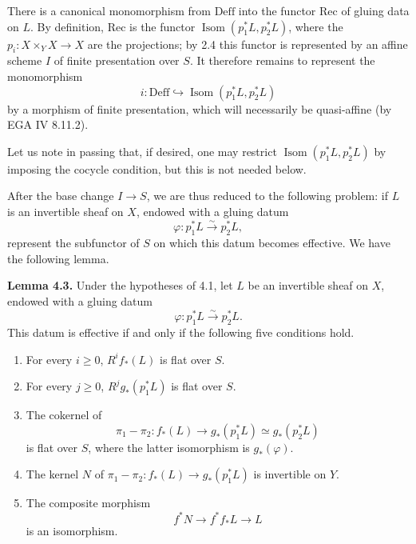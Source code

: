 
\providecommand{\Isom}{\operatorname{Isom}}
\providecommand{\Coker}{\operatorname{Coker}}
\providecommand{\Ker}{\operatorname{Ker}}
\providecommand{\Supp}{\operatorname{Supp}}
\providecommand{\Ass}{\operatorname{Ass}}

There is a canonical monomorphism from \(\mathrm{Deff}\) into the functor
\(\mathrm{Rec}\) of gluing data on \(L\). By definition,
\(\mathrm{Rec}\) is the functor
\(\Isom(p_1^*L,p_2^*L)\), where the
\(p_i:X\times_YX\to X\) are the projections; by 2.4 this functor is
represented by an affine scheme \(I\) of finite presentation over \(S\). It
therefore remains to represent the monomorphism
\[
  i:\mathrm{Deff}\hookrightarrow \Isom(p_1^*L,p_2^*L)
\]
by a morphism of finite presentation, which will necessarily be quasi-affine
(by EGA IV 8.11.2).

Let us note in passing that, if desired, one may restrict
\(\Isom(p_1^*L,p_2^*L)\) by imposing the cocycle condition, but this is not
needed below.

After the base change \(I\to S\), we are thus reduced to the following
problem: if \(L\) is an invertible sheaf on \(X\), endowed with a gluing datum
\[
  \varphi:p_1^*L\xrightarrow{\sim}p_2^*L,
\]
represent the subfunctor of \(S\) on which this datum becomes effective. We
have the following lemma.

\textbf{Lemma 4.3.} Under the hypotheses of 4.1, let \(L\) be an invertible
sheaf on \(X\), endowed with a gluing datum
\[
  \varphi:p_1^*L\xrightarrow{\sim}p_2^*L.
\]
This datum is effective if and only if the following five conditions hold.
\begin{enumerate}[label=\arabic*)]
\item For every \(i\geq0\), \(R^if_*(L)\) is flat over \(S\).
\item For every \(j\geq0\), \(R^jg_*(p_1^*L)\) is flat over \(S\).
\item The cokernel of
\[
  \pi_1-\pi_2:f_*(L)\longrightarrow
  g_*(p_1^*L)\simeq g_*(p_2^*L)
\]
is flat over \(S\), where the latter isomorphism is \(g_*(\varphi)\).
\item The kernel \(N\) of
\(\pi_1-\pi_2:f_*(L)\to g_*(p_1^*L)\) is invertible on \(Y\).
\item The composite morphism
\[
  f^*N\longrightarrow f^*f_*L\longrightarrow L
\]
is an isomorphism.
\end{enumerate}

